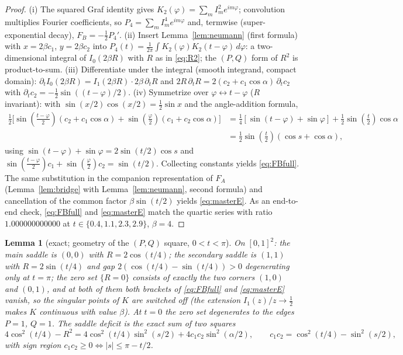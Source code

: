 \documentclass[11pt]{article}
\newtheorem{lemma}[theorem]{Lemma}
\theoremstyle{remark}
\newcommand{\FA}{F_{\!A}}
\newcommand{\FB}{F_{\!B}}
\newcommand{\dd}{\,d}
\begin{document}
\begin{proof}
(i) The squared Graf identity gives $K_2(\varphi)=\sum_mI_m^2
e^{im\varphi}$; convolution multiplies Fourier coefficients, so
$P_4=\sum_mI_m^4e^{im\varphi}$ and, termwise (super-exponential decay),
$\FB=-\tfrac12P_4'$. (ii) Insert Lemma~\ref{lem:neumann} (first formula)
with $x=2\beta c_1$, $y=2\beta c_2$ into $P_4(t)=\frac1{2\pi}\int
K_2(\varphi)K_2(t-\varphi)\dd\varphi$: a two-dimensional integral of
$I_0(2\beta R)$ with $R$ as in \eqref{eq:R2}; the $(P,Q)$ form of $R^2$
is product-to-sum. (iii) Differentiate under the integral (smooth
integrand, compact domain): $\partial_tI_0(2\beta R)=I_1(2\beta R)\cdot
2\beta\,\partial_tR$ and $2R\,\partial_tR=2(c_2+c_1\cos\alpha)\,
\partial_tc_2$ with $\partial_tc_2=-\tfrac12\sin((t-\varphi)/2)$.
(iv) Symmetrize over $\varphi\leftrightarrow t-\varphi$ ($R$ invariant):
with $\sin(x/2)\cos(x/2)=\tfrac12\sin x$ and the angle-addition formula,
\begin{align*}
\tfrac12\bigl[\sin(\tfrac{t-\varphi}{2})(c_2+c_1\cos\alpha)
+\sin(\tfrac{\varphi}{2})(c_1+c_2\cos\alpha)\bigr]
&=\tfrac14[\sin(t-\varphi)+\sin\varphi]
+\tfrac12\sin(\tfrac t2)\cos\alpha\\
&=\tfrac12\sin(\tfrac t2)(\cos s+\cos\alpha),
\end{align*}
using $\sin(t-\varphi)+\sin\varphi=2\sin(t/2)\cos s$ and
$\sin(\tfrac{t-\varphi}{2})c_1+\sin(\tfrac{\varphi}{2})c_2
=\sin(t/2)$. Collecting constants yields \eqref{eq:FBfull}. The same
substitution in the companion representation of $\FA$
(Lemma~\ref{lem:bridge} with Lemma~\ref{lem:neumann}, second formula)
and cancellation of the common factor $\beta\sin(t/2)$ yields
\eqref{eq:masterE}. As an end-to-end check, \eqref{eq:FBfull} and
\eqref{eq:masterE} match the quartic series with ratio
$1.000000000000$ at $t\in\{0.4,1.1,2.3,2.9\}$, $\beta=4$.
\end{proof}

\begin{lemma}[exact; geometry of the $(P,Q)$ square, $0<t<\pi$]
\label{lem:geometry}
On $[0,1]^2$: the main saddle is $(0,0)$ with $R=2\cos(t/4)$; the
secondary saddle is $(1,1)$ with $R=2\sin(t/4)$ and gap
$2(\cos(t/4)-\sin(t/4))>0$ degenerating only at $t=\pi$; the zero set
$\{R=0\}$ consists of exactly the two corners $(1,0)$ and $(0,1)$, and at
both of them \emph{both} brackets of \eqref{eq:FBfull} and
\eqref{eq:masterE} vanish, so the singular points of $K$ are switched off
(the extension $I_1(z)/z\to\tfrac12$ makes $K$ continuous with value
$\beta$). At $t=0$ the zero set degenerates to the edges $P=1$, $Q=1$.
The saddle deficit is the exact sum of two squares
\begin{equation}\label{eq:deficit}
4\cos^2(t/4)-R^2=4\cos^2(t/4)\sin^2(s/2)+4c_1c_2\sin^2(\alpha/2),
\qquad c_1c_2=\cos^2(t/4)-\sin^2(s/2),
\end{equation}
with sign region $c_1c_2\ge0\iff|s|\le\pi-t/2$.
\end{lemma}
\end{document}
